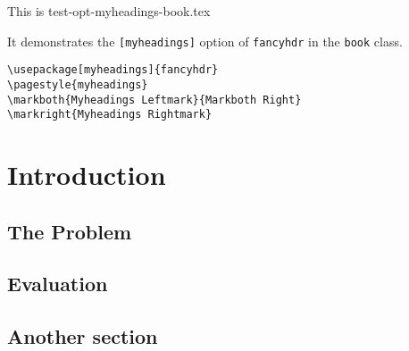 \documentclass[openany]{book}
\begin{document}
\tableofcontents

\bigskip

\noindent
\begin{boxedminipage}{\textwidth}
  This is test-opt-myheadings-book.tex

  It demonstrates the \texttt{[myheadings]} option of \texttt{fancyhdr} in
  the \texttt{book} class.

\begin{verbatim}
\usepackage[myheadings]{fancyhdr}
\pagestyle{myheadings}
\markboth{Myheadings Leftmark}{Markboth Right}
\markright{Myheadings Rightmark}
\end{verbatim}
\end{boxedminipage}

\chapter{Introduction}

\lipsum

\section{The Problem}
\label{sec:problem}

\lipsum[1]

\section{Evaluation}

\lipsum[2-4]

\section{Another section}

\lipsum[3]
\end{document}
